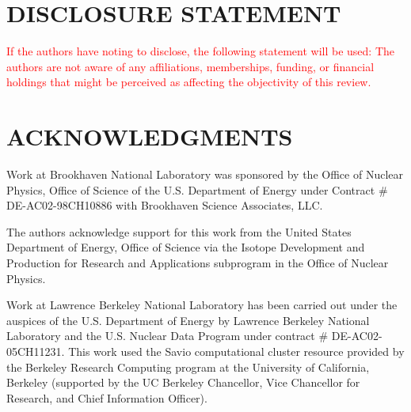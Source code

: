 \documentclass[letterpaper,draft]{ar-1col}
\newcommand{\textred}[1]{\textcolor{red}{ #1}}
\begin{document}
% 
% 

\section*{DISCLOSURE STATEMENT}
\textred{If the authors have noting to disclose, the following statement will be used: The authors are not aware of any affiliations, memberships, funding, or financial holdings that
might be perceived as affecting the objectivity of this review. }

\section*{ACKNOWLEDGMENTS}
Work at Brookhaven National Laboratory was sponsored by the Office of Nuclear Physics, Office of Science of the U.S. Department of Energy under Contract \# DE-AC02-98CH10886 with Brookhaven Science Associates, LLC.

The authors acknowledge support for this work from the United States Department of Energy, Office of Science via the Isotope Development and Production for Research and Applications subprogram in the Office of Nuclear Physics. 

Work at Lawrence Berkeley National Laboratory has been carried out  under the auspices of the U.S. Department of Energy by  Lawrence Berkeley National Laboratory and the U.S. Nuclear Data Program under contract \# DE-AC02-05CH11231. This work used the Savio computational cluster resource provided by the Berkeley Research Computing program at the University of California, Berkeley (supported by the UC Berkeley Chancellor, Vice Chancellor for Research, and Chief Information Officer).
\end{document}
